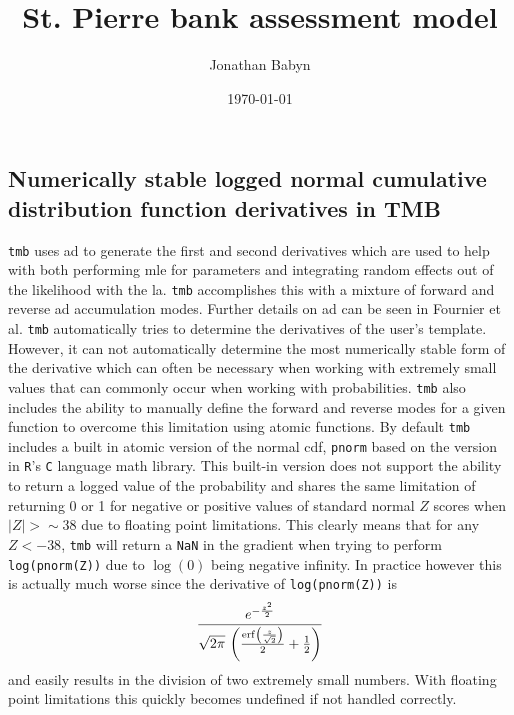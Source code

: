 \documentclass[11pt]{article}\usepackage[]{graphicx}\usepackage[]{color}
\begin{document}
\title{St. Pierre bank assessment model}
\author{Jonathan Babyn}
\date{\today}
\maketitle

\tableofcontents
\newpage

\printnomenclature

\begin{appendices}
\section{Numerically stable logged normal cumulative distribution function derivatives in TMB}
\texttt{\acrshort{tmb}} uses \acrfull{ad} to generate the first and second derivatives which are used to help with both performing \acrshort{mle} for parameters and integrating random effects out of the likelihood with the \acrfull{la}. \texttt{\acrshort{tmb}} accomplishes this with a mixture of forward and reverse \acrshort{ad} accumulation modes. Further details on \acrshort{ad} can be seen in Fournier et al\cite{Fournier_2012}. \texttt{\acrshort{tmb}} automatically tries to determine the derivatives of the user's template. However, it can not automatically determine the most numerically stable form of the derivative which can often be necessary when working with extremely small values that can commonly occur when working with probabilities. \texttt{\acrshort{tmb}} also includes the ability to manually define the forward and reverse modes for a given function to overcome this limitation using atomic functions. By default \texttt{\acrshort{tmb}} includes a built in atomic version of the normal \acrshort{cdf}, \texttt{pnorm} based on the version in \texttt{R}'s \texttt{C} language math library. This built-in version does not support the ability to return a logged value of the probability and shares the same limitation of returning 0 or 1 for negative or positive values of standard normal $Z$ scores when $|Z| > \sim 38$ due to floating point limitations. This clearly means that for any $Z < -38$, \texttt{\acrshort{tmb}} will return a \texttt{NaN} in the gradient when trying to perform \texttt{log(pnorm(Z))} due to $\log(0)$ being negative infinity. In practice however this is actually much worse since the derivative of \texttt{log(pnorm(Z))} is 
\begin{equation}\label{derlNCDF}
	{{e^ {- {{z^2}\over{2}} }}\over{\sqrt{2\pi}\,\left({{
 \mathrm{erf}\left({{z}\over{\sqrt{2}}}\right)}\over{2}}+{{1}\over{2
 }}\right)}}
\end{equation}
and easily results in the division of two extremely small numbers. With floating point limitations this quickly becomes undefined if not handled correctly. 


\end{appendices}
\end{document}
